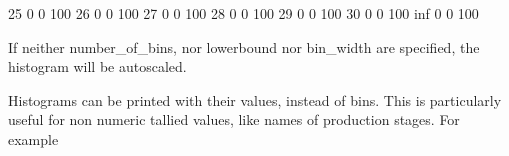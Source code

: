 \documentclass[letterpaper,10pt,english]{sphinxmanual}
\begin{document}
\begin{sphinxVerbatim}[commandchars=\\\{\}]
       25             0       0   100                                                                                   \textbar{}
       26             0       0   100                                                                                   \textbar{}
       27             0       0   100                                                                                   \textbar{}
       28             0       0   100                                                                                   \textbar{}
       29             0       0   100                                                                                   \textbar{}
       30             0       0   100                                                                                   \textbar{}
          inf         0       0   100
\end{sphinxVerbatim}

If neither number\_of\_bins, nor lowerbound nor bin\_width are specified, the histogram will be autoscaled.

Histograms can be printed with their values, instead of bins. This is particularly useful for non
numeric tallied values, like names of production stages. For example

%
\begin{sphinxVerbatim}[commandchars=\\\{\}]
  
           

                          
                               
                            
                              
                                
                             
                               
                                
\end{sphinxVerbatim}
\end{document}
